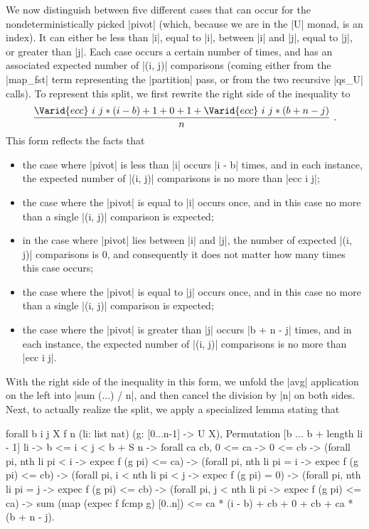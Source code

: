 \documentclass[runningheads]{llncs}
\begin{document}
We now distinguish between five different cases that can occur for the nondeterministically picked |pivot| (which, because we are in the |U| monad, is an index). It can either be less than |i|, equal to |i|, between |i| and |j|, equal to |j|, or greater than |j|. Each case occurs a certain number of times, and has an associated expected number of |(i, j)| comparisons (coming either from the |map_fst| term representing the |partition| pass, or from the two recursive |qs_U| calls). To represent this split, we first rewrite the right side of the inequality to\[\frac{\Varid{ecc}\ i\ j * (i - b) + 1 + 0 + 1 + \Varid{ecc}\ i\ j * (b + n - j)}{n}\ .\]
This form reflects the facts that
\begin{itemize}
\item the case where |pivot| is less than |i| occurs |i - b| times, and in each instance, the expected number of |(i, j)| comparisons is no more than |ecc i j|;
\item the case where the |pivot| is equal to |i| occurs once, and in this case no more than a single |(i, j)| comparison is expected;
\item in the case where |pivot| lies between |i| and |j|, the number of expected |(i, j)| comparisons is 0, and consequently it does not matter how many times this case occurs;
\item the case where the |pivot| is equal to |j| occurs once, and in this case no more than a single |(i, j)| comparison is expected;
\item the case where the |pivot| is greater than |j| occurs |b + n - j| times, and in each instance, the expected number of |(i, j)| comparisons is no more than |ecc i j|.
\end{itemize}
With the right side of the inequality in this form, we unfold the |avg| application on the left into |sum (...) / n|, and then cancel the division by |n| on both sides. Next, to actually realize the split, we apply a specialized lemma stating that
\begin{code}
   forall b i j X f n (li: list nat)
     (g: [0...n-1] -> U X), Permutation [b ... b + length li - 1] li ->
    b <= i < j < b + S n -> forall ca cb, 0 <= ca -> 0 <= cb ->
    (forall pi, nth li pi < i -> expec f (g pi) <= ca) ->
    (forall pi, nth li pi = i -> expec f (g pi) <= cb) ->
    (forall pi, i < nth li pi < j -> expec f (g pi) = 0) ->
    (forall pi, nth li pi = j -> expec f (g pi) <= cb) ->
    (forall pi, j < nth li pi -> expec f (g pi) <= ca) ->
      sum (map (expec f fcmp g) [0..n]) <=
        ca * (i - b) + cb + 0 + cb + ca * (b + n - j).
\end{code}
\end{document}
